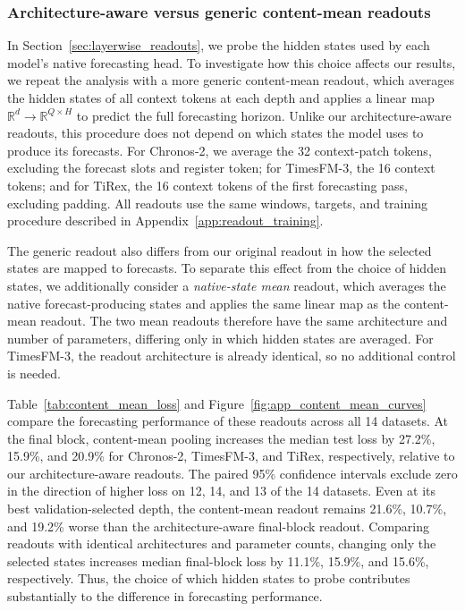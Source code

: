
\subsubsection{Architecture-aware versus generic content-mean readouts}
\label{sec:app_content_mean}

In Section~\ref{sec:layerwise_readouts}, we probe the hidden states used by each model's native forecasting head. To investigate how this choice affects our results, we repeat the analysis with a more generic content-mean readout, which averages the hidden states of all context tokens at each depth and applies a linear map $\mathbb{R}^{d}\to\mathbb{R}^{Q\times H}$ to predict the full forecasting horizon. Unlike our architecture-aware readouts, this procedure does not depend on which states the model uses to produce its forecasts. For Chronos-2, we average the 32 context-patch tokens, excluding the forecast slots and register token; for TimesFM-3, the 16 context tokens; and for TiRex, the 16 context tokens of the first forecasting pass, excluding padding. All readouts use the same windows, targets, and training procedure described in Appendix~\ref{app:readout_training}.

The generic readout also differs from our original readout in how the selected states are mapped to forecasts. To separate this effect from the choice of hidden states, we additionally consider a \emph{native-state mean} readout, which averages the native forecast-producing states and applies the same linear map as the content-mean readout. The two mean readouts therefore have the same architecture and number of parameters, differing only in which hidden states are averaged. For TimesFM-3, the readout architecture is already identical, so no additional control is needed.

Table~\ref{tab:content_mean_loss} and Figure~\ref{fig:app_content_mean_curves} compare the forecasting performance of these readouts across all 14 datasets. At the final block, content-mean pooling increases the median test loss by 27.2\%, 15.9\%, and 20.9\% for Chronos-2, TimesFM-3, and TiRex, respectively, relative to our architecture-aware readouts. The paired 95\% confidence intervals exclude zero in the direction of higher loss on 12, 14, and 13 of the 14 datasets. Even at its best validation-selected depth, the content-mean readout remains 21.6\%, 10.7\%, and 19.2\% worse than the architecture-aware final-block readout. Comparing readouts with identical architectures and parameter counts, changing only the selected states increases median final-block loss by 11.1\%, 15.9\%, and 15.6\%, respectively. Thus, the choice of which hidden states to probe contributes substantially to the difference in forecasting performance.

